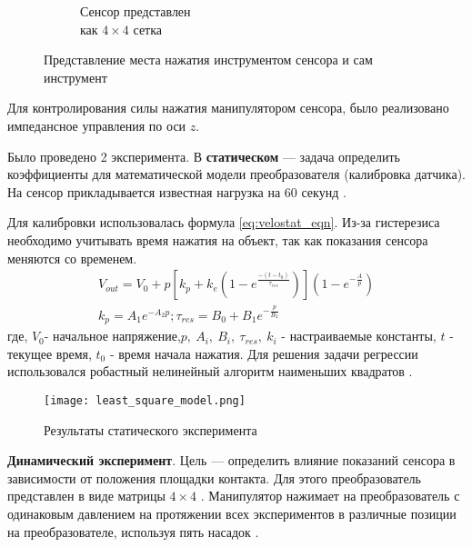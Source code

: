 \begin{figure}[ht]
\begin{subfigure}{0.38\textwidth}
        \caption{Сенсор представлен \\ как $4\times4$ сетка}
        \label{fig:sensor_grid}
    \end{subfigure}
    \caption{Представление места нажатия инструментом сенсора и сам инструмент}
\end{figure}

Для контролирования силы нажатия манипулятором сенсора, было реализовано импедансное управления по оси $z$.

Было проведено 2 эксперимента. В \textbf{статическом} --- задача определить коэффициенты для математической модели преобразователя (калибровка датчика). На сенсор прикладывается известная нагрузка на 60 секунд .

Для калибровки использовалась формула \eqref{eq:velostat_eqn}. Из-за гистерезиса необходимо учитывать время нажатия на объект, так как показания сенсора меняются со временем.
\begin{align}
    \label{eq:velostat_eqn}
    V_{out} = V_0 + p[k_p + k_e(1-e^\frac{-(t-t_0)}{\tau_{res}})](1-e^{-\frac{A}{p}}) \\
    k_p = A_1e^{-A_2p}; \tau_{res} = B_0 + B_1e^{-\frac{p}{B_2}}
\end{align}
где,  $V_0$- начальное напряжение,$p,\ A_i,\ B_i,\ \tau_{res},\ k_i$  - настраиваемые константы, $t$ - текущее время, $t_0$ - время начала нажатия.
Для решения задачи регрессии использовался робастный нелинейный алгоритм наименьших квадратов .

\begin{figure}[H]
    \centering\texttt{[image: least\_square\_model.png]}
    \caption{Результаты статического эксперимента}
    \label{fig:least_square_model.png}
\end{figure}

\textbf{Динамический эксперимент}. Цель --- определить влияние показаний сенсора в зависимости от положения площадки контакта. Для этого преобразователь представлен в виде матрицы $4 \times 4$ . Манипулятор нажимает на преобразователь с одинаковым давлением на протяжении всех экспериментов в различные позиции на преобразователе, используя пять насадок .



